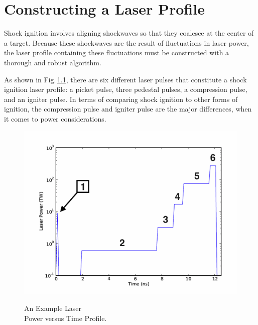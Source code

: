 
\vspace{24pt}

\chapter[\textbf{Constructing a Laser Profile}]{Constructing a Laser Profile}

Shock ignition involves aligning shockwaves so that they coalesce at the center of a target.  Because these shockwaves are the result of fluctuations in laser power, the laser profile containing these fluctuations must be constructed with a thorough and robust algorithm.  

As shown in Fig.\,\ref{fig:profConst}, there are six different laser pulses that constitute a shock ignition laser profile: a picket pulse, three pedestal pulses, a compression pulse, and an igniter pulse.  In terms of comparing shock ignition to other forms of ignition, the compression pulse and igniter pulse are the major differences, when it comes to power considerations.


\begin{figure}	
	\centering
	\caption[A Laser Power versus Time Profile]{ An Example Laser \\ Power versus Time Profile. \\  }
	\includegraphics[scale=0.9]{graphics/profConst.png} 
	\label{fig:profConst}
\end{figure}

